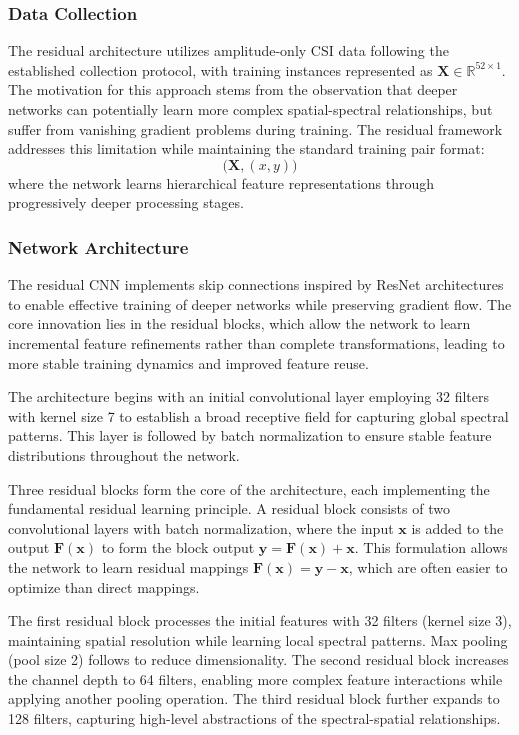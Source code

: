 \subsubsection{Data Collection}
The residual architecture utilizes amplitude-only CSI data following the established collection protocol, with training instances represented as $\mathbf{X} \in \mathbb{R}^{52 \times 1}$. The motivation for this approach stems from the observation that deeper networks can potentially learn more complex spatial-spectral relationships, but suffer from vanishing gradient problems during training. The residual framework addresses this limitation while maintaining the standard training pair format:
\begin{equation}\label{eq:residual_training}
\big(\mathbf{X}, (x,y)\big)
\end{equation}
where the network learns hierarchical feature representations through progressively deeper processing stages.

\subsubsection{Network Architecture}
The residual CNN implements skip connections inspired by ResNet architectures to enable effective training of deeper networks while preserving gradient flow. The core innovation lies in the residual blocks, which allow the network to learn incremental feature refinements rather than complete transformations, leading to more stable training dynamics and improved feature reuse.

The architecture begins with an initial convolutional layer employing 32 filters with kernel size 7 to establish a broad receptive field for capturing global spectral patterns. This layer is followed by batch normalization to ensure stable feature distributions throughout the network.

Three residual blocks form the core of the architecture, each implementing the fundamental residual learning principle. A residual block consists of two convolutional layers with batch normalization, where the input $\mathbf{x}$ is added to the output $\mathbf{F}(\mathbf{x})$ to form the block output $\mathbf{y} = \mathbf{F}(\mathbf{x}) + \mathbf{x}$. This formulation allows the network to learn residual mappings $\mathbf{F}(\mathbf{x}) = \mathbf{y} - \mathbf{x}$, which are often easier to optimize than direct mappings.

The first residual block processes the initial features with 32 filters (kernel size 3), maintaining spatial resolution while learning local spectral patterns. Max pooling (pool size 2) follows to reduce dimensionality. The second residual block increases the channel depth to 64 filters, enabling more complex feature interactions while applying another pooling operation. The third residual block further expands to 128 filters, capturing high-level abstractions of the spectral-spatial relationships.

